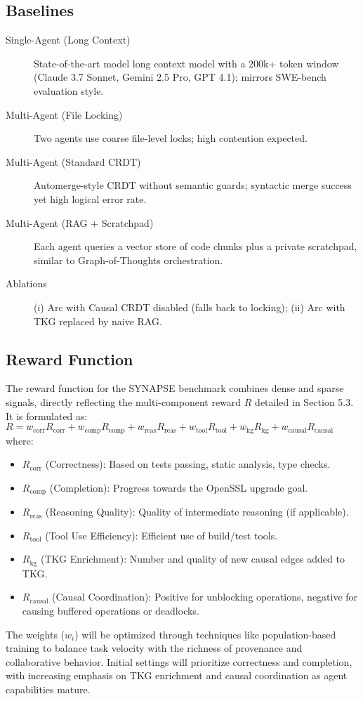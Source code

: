 \documentclass{article}
\begin{document}
\subsection{Baselines}
\begin{description}
    \item[Single-Agent (Long Context)] State-of-the-art model long context model with a 200k+ token window (Claude 3.7 Sonnet, Gemini 2.5 Pro, GPT 4.1); mirrors SWE-bench evaluation style.
    \item[Multi-Agent (File Locking)] Two agents use coarse file-level locks; high contention expected.
    \item[Multi-Agent (Standard CRDT)] Automerge-style CRDT without semantic guards; syntactic merge success yet high logical error rate.
    \item[Multi-Agent (RAG + Scratchpad)] Each agent queries a vector store of code chunks plus a private scratchpad, similar to Graph-of-Thoughts orchestration.
    \item[Ablations] (i) Arc with Causal CRDT disabled (falls back to locking); (ii) Arc with TKG replaced by naive RAG.
\end{description}

\subsection{Reward Function}
The reward function for the SYNAPSE benchmark combines dense and sparse signals, directly reflecting the multi-component reward $R$ detailed in Section 5.3. It is formulated as:
$R = w_{\text{corr}}R_{\text{corr}} + w_{\text{comp}}R_{\text{comp}} + w_{\text{reas}}R_{\text{reas}} + w_{\text{tool}}R_{\text{tool}} + w_{\text{kg}}R_{\text{kg}} + w_{\text{causal}}R_{\text{causal}}$
where:
\begin{itemize}
    \item $R_{\text{corr}}$ (Correctness): Based on tests passing, static analysis, type checks.
    \item $R_{\text{comp}}$ (Completion): Progress towards the OpenSSL upgrade goal.
    \item $R_{\text{reas}}$ (Reasoning Quality): Quality of intermediate reasoning (if applicable).
    \item $R_{\text{tool}}$ (Tool Use Efficiency): Efficient use of build/test tools.
    \item $R_{\text{kg}}$ (TKG Enrichment): Number and quality of new causal edges added to TKG.
    \item $R_{\text{causal}}$ (Causal Coordination): Positive for unblocking operations, negative for causing buffered operations or deadlocks.
\end{itemize}
The weights ($w_i$) will be optimized through techniques like population-based training to balance task velocity with the richness of provenance and collaborative behavior. Initial settings will prioritize correctness and completion, with increasing emphasis on TKG enrichment and causal coordination as agent capabilities mature.
\end{document}

